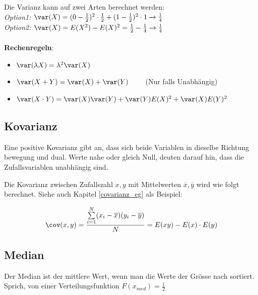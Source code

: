 \noindent Die Varianz kann auf zwei Arten berechnet werden:\\
\textit{Option1:} $\var(X) = (0 - \frac{1}{2})^2 \cdot \frac{1}{2} + (1 - \frac{1}{2})^2 \cdot 1 \xrightarrow{} \frac{1}{4}$\\
\textit{Option2:} $\var(X) = E(X^2) - E(X)^2 = \frac{1}{2} - \frac{1}{4} \rightarrow \frac{1}{4}$
\\ ~\\
\noindent\textbf{Rechenregeln}:
\begin{itemize}[nosep]
	\item $\var(\lambda X) = \lambda^2\var(X)$
	\item $\var(X + Y) = \var(X) + \var(Y) \qquad$ (Nur falls Unabhängig)
	\item $\var(X\cdot Y) = \var(X)\var(Y) + \var(Y)E(X)^2 + \var(X)E(Y)^2$
\end{itemize}

\subsection{Kovarianz}
Eine positive Kovarianz gibt an, dass sich beide Variablen in dieselbe Richtung bewegung und dual. Werte nahe oder gleich Null, deuten darauf hin, dass die Zufallsvariablen unabhängig sind.

Die Kovarianz zwischen Zufallszahl $x,y$ mit Mittelwerten $\overline{x}, \overline{y}$ wird wie folgt berechnet. Siehe auch Kapitel \ref{covarianz_eg} als Beispiel:

\[
\cov(x,y) = \frac{\sum\limits_{i=1}^{N}(x_i - \overline{x})(y_i - \overline{y})}{N} = E(xy) - E(x)\cdot E(y)
\]

\subsection{Median}
Der Median ist der mittlere Wert, wenn man die Werte der Grösse nach sortiert. Sprich, von einer Verteilungsfunktion $F(x_{med}) = \frac{1}{2}$

